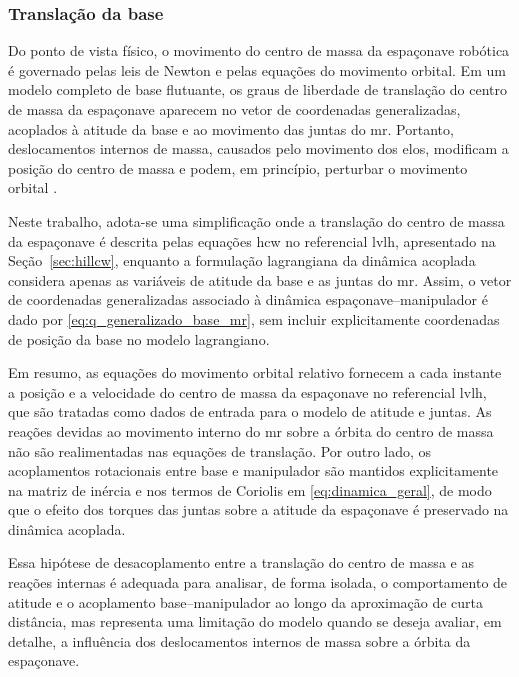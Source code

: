 \subsubsection{Translação da base}
\label{sec:dinAcoplada_translacao_base}

Do ponto de vista físico, o movimento do centro de massa da espaçonave
robótica é governado pelas leis de Newton e pelas equações do movimento
orbital.
Em um modelo completo de base flutuante, os graus de liberdade de
translação do centro de massa da espaçonave aparecem no vetor de
coordenadas generalizadas, acoplados à atitude da base e ao movimento
das juntas do \gls{mr}.
Portanto, deslocamentos internos de massa, causados pelo
movimento dos elos, modificam a posição do centro de massa e podem, em
princípio, perturbar o movimento orbital \cite{wie2008space,featherstone2008}.

Neste trabalho, adota-se uma simplificação onde
a translação do centro de massa da espaçonave é descrita pelas equações \gls{hcw} no referencial \gls{lvlh},
apresentado na Seção~\ref{sec:hillcw}, enquanto a formulação
lagrangiana da dinâmica acoplada considera apenas as variáveis de
atitude da base e as juntas do \gls{mr}.
Assim, o vetor de coordenadas generalizadas associado à dinâmica
espaçonave--manipulador é dado por \eqref{eq:q_generalizado_base_mr}, sem
incluir explicitamente coordenadas de posição da base no modelo
lagrangiano.

Em resumo, as equações do movimento orbital relativo fornecem a cada
instante a posição e a velocidade do centro de massa da espaçonave no
referencial \gls{lvlh}, que são tratadas como dados de entrada para o
modelo de atitude e juntas.
As reações devidas ao movimento interno do \gls{mr} sobre a
órbita do centro de massa não são realimentadas nas equações de
translação.
Por outro lado, os acoplamentos rotacionais entre base e manipulador
são mantidos explicitamente na matriz de inércia e nos termos de
Coriolis em \eqref{eq:dinamica_geral}, de modo que o efeito dos torques
das juntas sobre a atitude da espaçonave é preservado na dinâmica
acoplada.

Essa hipótese de desacoplamento entre a translação do centro de massa e
as reações internas é adequada para analisar, de forma isolada, o
comportamento de atitude e o acoplamento base--manipulador ao longo da
aproximação de curta distância, mas representa uma limitação do modelo
quando se deseja avaliar, em detalhe, a influência dos deslocamentos
internos de massa sobre a órbita da espaçonave.
